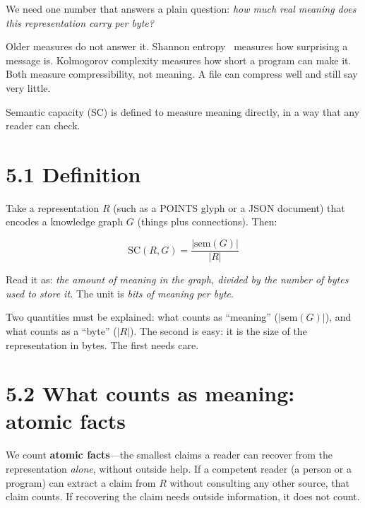\label{sec:metric}

We need one number that answers a plain question: \textit{how much real meaning does this representation carry per byte?}

Older measures do not answer it. Shannon entropy~\cite{shannon1948mathematical} measures how surprising a message is. Kolmogorov complexity measures how short a program can make it. Both measure compressibility, not meaning. A file can compress well and still say very little.

Semantic capacity (SC) is defined to measure meaning directly, in a way that any reader can check.

\section*{5.1 Definition}

Take a representation $R$ (such as a POINTS glyph or a JSON document) that encodes a knowledge graph $G$ (things plus connections). Then:

\begin{equation}
\text{SC}(R, G) = \frac{|\text{sem}(G)|}{|R|}
\end{equation}

Read it as: \textit{the amount of meaning in the graph, divided by the number of bytes used to store it.} The unit is \textit{bits of meaning per byte}.

Two quantities must be explained: what counts as ``meaning'' ($|\text{sem}(G)|$), and what counts as a ``byte'' ($|R|$). The second is easy: it is the size of the representation in bytes. The first needs care.

\section*{5.2 What counts as meaning: atomic facts}

We count \textbf{atomic facts}---the smallest claims a reader can recover from the representation \textit{alone}, without outside help. If a competent reader (a person or a program) can extract a claim from $R$ without consulting any other source, that claim counts. If recovering the claim needs outside information, it does not count.

